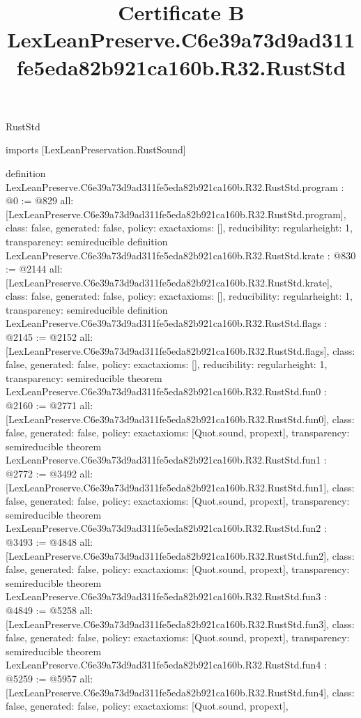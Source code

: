 \begin{lexlean}{RustStd}
\title{Certificate B LexLeanPreserve.C6e39a73d9ad311fe5eda82b921ca160b.R32.RustStd}
\begin{coremodule}
imports [LexLeanPreservation.RustSound]

definition LexLeanPreserve.C6e39a73d9ad311fe5eda82b921ca160b.R32.RustStd.program : @0 := @829 {
  all: [LexLeanPreserve.C6e39a73d9ad311fe5eda82b921ca160b.R32.RustStd.program],
  class: false,
  generated: false,
  policy: exact{axioms: []},
  reducibility: regular{height: 1},
  transparency: semireducible
}
definition LexLeanPreserve.C6e39a73d9ad311fe5eda82b921ca160b.R32.RustStd.krate : @830 := @2144 {
  all: [LexLeanPreserve.C6e39a73d9ad311fe5eda82b921ca160b.R32.RustStd.krate],
  class: false,
  generated: false,
  policy: exact{axioms: []},
  reducibility: regular{height: 1},
  transparency: semireducible
}
definition LexLeanPreserve.C6e39a73d9ad311fe5eda82b921ca160b.R32.RustStd.flags : @2145 := @2152 {
  all: [LexLeanPreserve.C6e39a73d9ad311fe5eda82b921ca160b.R32.RustStd.flags],
  class: false,
  generated: false,
  policy: exact{axioms: []},
  reducibility: regular{height: 1},
  transparency: semireducible
}
theorem LexLeanPreserve.C6e39a73d9ad311fe5eda82b921ca160b.R32.RustStd.fun0 : @2160 := @2771 {
  all: [LexLeanPreserve.C6e39a73d9ad311fe5eda82b921ca160b.R32.RustStd.fun0],
  class: false,
  generated: false,
  policy: exact{axioms: [Quot.sound, propext]},
  transparency: semireducible
}
theorem LexLeanPreserve.C6e39a73d9ad311fe5eda82b921ca160b.R32.RustStd.fun1 : @2772 := @3492 {
  all: [LexLeanPreserve.C6e39a73d9ad311fe5eda82b921ca160b.R32.RustStd.fun1],
  class: false,
  generated: false,
  policy: exact{axioms: [Quot.sound, propext]},
  transparency: semireducible
}
theorem LexLeanPreserve.C6e39a73d9ad311fe5eda82b921ca160b.R32.RustStd.fun2 : @3493 := @4848 {
  all: [LexLeanPreserve.C6e39a73d9ad311fe5eda82b921ca160b.R32.RustStd.fun2],
  class: false,
  generated: false,
  policy: exact{axioms: [Quot.sound, propext]},
  transparency: semireducible
}
theorem LexLeanPreserve.C6e39a73d9ad311fe5eda82b921ca160b.R32.RustStd.fun3 : @4849 := @5258 {
  all: [LexLeanPreserve.C6e39a73d9ad311fe5eda82b921ca160b.R32.RustStd.fun3],
  class: false,
  generated: false,
  policy: exact{axioms: [Quot.sound, propext]},
  transparency: semireducible
}
theorem LexLeanPreserve.C6e39a73d9ad311fe5eda82b921ca160b.R32.RustStd.fun4 : @5259 := @5957 {
  all: [LexLeanPreserve.C6e39a73d9ad311fe5eda82b921ca160b.R32.RustStd.fun4],
  class: false,
  generated: false,
  policy: exact{axioms: [Quot.sound, propext]},
}
\end{coremodule}
\end{lexlean}
